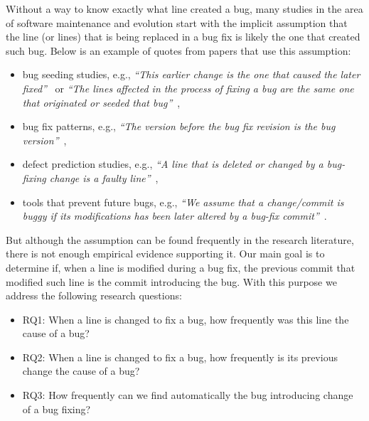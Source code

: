 \documentclass[conference]{IEEEtran}
\begin{document}
Without a way to know exactly what line created a bug, many studies in the area of software maintenance and evolution start with the implicit assumption that the line (or lines) that is being replaced in a bug fix is likely the one that created such bug. Below is an example of quotes from papers that use this assumption:

\begin{itemize}
\item bug seeding studies, e.g., \textit{``This earlier change is the one that caused the later
    fixed''}~\cite{williams2008szz} or \textit{``The lines affected in the process of fixing a bug are the same one that
    originated or seeded that bug''}~\cite{izquierdo2011developers},
\item bug fix patterns, e.g., \textit{``The version before the bug fix revision is the bug
    version''}~\cite{pan2009toward},
\item defect prediction studies, e.g., \textit{``A line that is deleted or changed by a bug-fixing change is a faulty
    line''}~\cite{altman1968financial},
\item tools that prevent future bugs, e.g., \textit{``We assume that a change/commit is buggy if its modifications has
    been later altered by a bug-fix commit''}~\cite{fejzer2015supporting}.
\end{itemize}

But although the assumption can be found frequently in the research literature, there is not enough empirical evidence supporting it. Our main goal is to determine if, when a line is modified during a bug fix, the previous commit that modified such line is the commit introducing the bug. With this purpose we address the following research questions: 

\begin{itemize}
	\item RQ1: When a line is changed to fix a bug, how frequently was this line the cause of a bug?
	\item RQ2: When a line is changed to fix a bug, how frequently is its previous change the cause of a bug?
	\item RQ3: How frequently can we find automatically the bug introducing change of a bug fixing?
\end{itemize}
\end{document}
